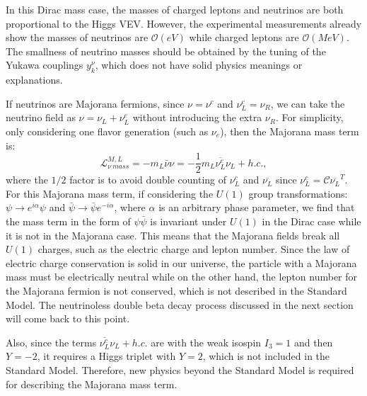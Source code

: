 In this Dirac mass case, the masses of charged leptons and neutrinos are both proportional to the Higgs VEV. However, the experimental measurements already show the masses of neutrinos are $\mathcal O(eV)$ 
while charged leptons are $\mathcal O(MeV)$. The smallness of neutrino masses should be obtained by the tuning of the Yukawa couplings $y_k^\nu$, which does not have solid physics meanings or explanations.

If neutrinos are Majorana fermions, since $\nu=\nu^c$ and $\nu_L^c=\nu_R$, we can take the neutrino field as $\nu=\nu_L+\nu_L^c$ without introducing the extra $\nu_R$. For simplicity, only considering one flavor generation (such as $\nu_e$), then the Majorana mass term is:  
\begin{equation}\label{major_mass}
\mathcal{L}^{M,L}_{\nu~mass} = -m_L\bar{\nu}\nu=-\frac{1}{2}m_L\overline{\nu_L^c}\nu_L+h.c.,
\end{equation}
where the $1/2$ factor is to avoid double counting of $\nu_L^c$ and $\overline{\nu_L}$ since $\nu_L^c=\mathcal{C}\overline{\nu_L}^T$\cite{giunti2007fundamentals}. For this Majorana mass term, if considering the $U(1)$ group transformations: $\psi\to e^{i\alpha}\psi$ and $\bar \psi \to \bar\psi e^{-i\alpha}$, where $\alpha$ is an arbitrary phase parameter, we find that the mass term in the form of $\psi\bar\psi$ is invariant under $U(1)$ in the Dirac case while it is not in the Majorana case. This means that the Majorana fields break all $U(1)$ charges, such as the electric charge and lepton number\cite{akhmedov2014majorana}. Since the law of electric charge conservation is solid in our universe, the particle with a Majorana mass must be electrically neutral while on the other hand, the lepton number for the Majorana fermion is not conserved, which is not described in the Standard Model. The neutrinoless double beta decay process discussed in the next section will come back to this point.

Also, since the terms $\overline{\nu_L^c}\nu_L+h.c.$ are with the weak isospin $I_3=1$ and then $Y=-2$, it requires a Higgs triplet with $Y=2$, which is not included in the Standard Model\cite{funchal2013physics}. Therefore, new physics beyond the Standard Model is required for describing the Majorana mass term.


